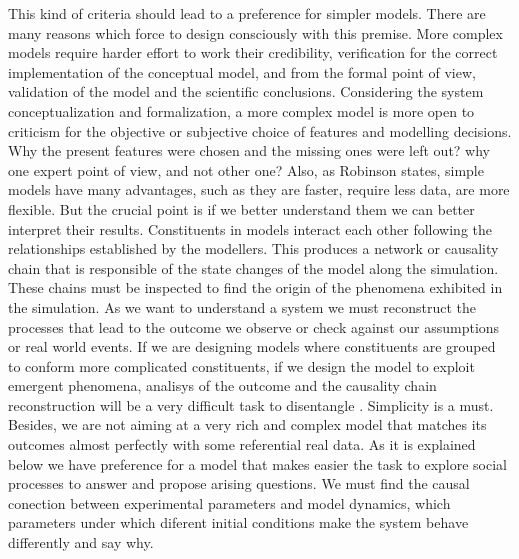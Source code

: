 \documentclass[11pt,oneside,a4paper,openright]{report}
\begin{document}
This kind of criteria should lead to a preference for simpler models. There are many reasons which force to design consciously with this premise. More complex models require harder effort to work their credibility, verification  for the correct implementation of the conceptual model, and from the formal point of view, validation of the model and the scientific conclusions. Considering the system conceptualization and formalization, a more complex model is more open to criticism for the objective or subjective choice of features and modelling decisions. Why the present features were chosen and the missing ones were left out? why one expert point of view, and not other one? Also, as Robinson \cite{Robinson2008} states, simple models have many advantages, such as they are faster, require less data, are more flexible. But the crucial point is if we better understand them we can better interpret their results. Constituents in models interact each other following the relationships established by the modellers. This produces a network or causality chain that is responsible of the state changes of the model along the simulation. These chains must be inspected to find the origin of the phenomena exhibited in the simulation. As we want to understand a system we must reconstruct the processes that lead to the outcome we observe or check against our assumptions or real world events. If we are designing models where constituents are grouped to conform more complicated constituents, if we design the model to exploit emergent phenomena, analisys of the outcome and the causality chain reconstruction will be a very difficult task to disentangle \cite{Premo2010_pg31}\label{myPremo_simplicity}. Simplicity is a must. Besides, we are not aiming at a very rich and complex model that matches its outcomes almost perfectly with some referential real data. As it is explained below we have preference for a model that makes easier the task to explore social processes to answer and propose arising questions. We must find the causal conection between experimental parameters and model dynamics, which parameters under which diferent initial conditions make the system behave differently and say why.   
\end{document}
